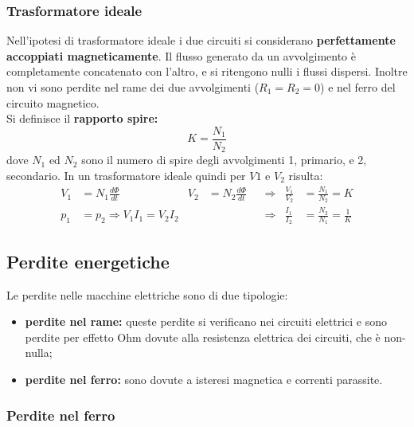 \documentclass{article}
\begin{document}
\subsubsection{Trasformatore ideale}
Nell'ipotesi di trasformatore ideale i due circuiti si considerano \textbf{perfettamente accoppiati magneticamente}. Il flusso generato da un avvolgimento è completamente concatenato con l'altro, e si ritengono nulli i flussi dispersi. 
Inoltre non vi sono perdite nel rame dei due
avvolgimenti ($R_1 = R_2 = 0$) e nel ferro del circuito magnetico.\\
Si definisce il \textbf{rapporto spire:}
\[K=\frac{N_1}{N_2}\]
dove $N_1$ ed $N_2$ sono il numero di spire degli avvolgimenti 1, primario, e 2, secondario. In un trasformatore ideale quindi per $V1$ e $V_2$ risulta:
\begin{align*}
    V_1 &= N_1 \frac{d \Phi}{dt} & 
    V_2 &= N_2 \frac{d\Phi}{dt} &
    &\Longrightarrow &
    \frac{V_1}{V_2} &= \frac{N_1}{N_2} = K
    \\
    p_1 &= p_2 \Longrightarrow V_1 I_1 = V_2I_2 &
    & &
    &\Longrightarrow &
    \frac{I_1}{I_2} &= \frac{N_2}{N_1}=\frac{1}{K}
\end{align*}


\subsection{Perdite energetiche}
Le perdite nelle macchine elettriche sono di due tipologie:
\begin{itemize}
    \item \textbf{perdite nel rame:} queste perdite si verificano nei circuiti elettrici e sono perdite per effetto Ohm dovute alla resistenza elettrica dei circuiti, che è non-nulla;
    \item \textbf{perdite nel ferro:} sono dovute a isteresi magnetica e correnti parassite.
\end{itemize}


\subsubsection{Perdite nel ferro}
\end{document}
